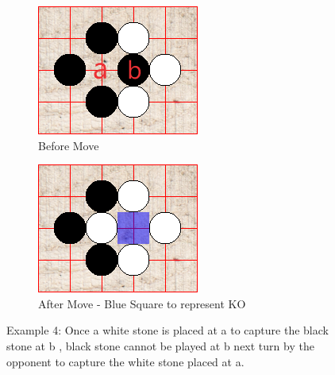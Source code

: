 \documentclass{l4proj}
\begin{document}
\begin{figure}[!h]
\centering
\begin{subfigure}[b]{0.45\textwidth}
\centering
\includegraphics[width=\textwidth]{ex/Ex4-0.png}
\caption{Before Move}
\label{fig:ex4-0}
\end{subfigure}
\begin{subfigure}[b]{0.45\textwidth}
\centering
\includegraphics[width=\textwidth]{ex/Ex4-1.png}
\caption{After Move - Blue Square to represent KO}
\label{fig:ex4-1}
\end{subfigure}
\caption{Example 4: Once a white stone is placed at a to capture the black stone at b , black stone cannot be played at b next turn by the opponent to capture the white stone placed at a.}
\label{fig:ex4}
\end{figure}
\end{document}
